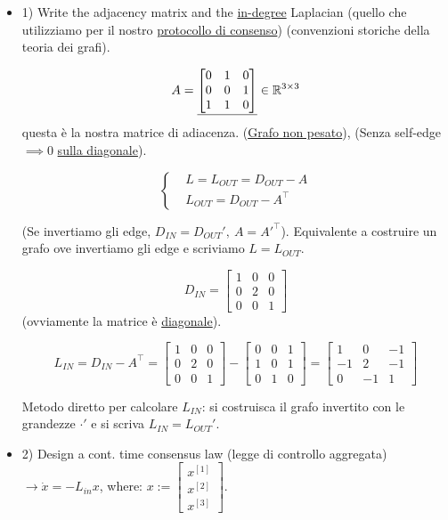 \begin{itemize}
\item{1)} Write the adjacency matrix and the \underline{in-degree} Laplacian (quello che utilizziamo per il nostro \underline{protocollo di consenso}) (convenzioni storiche della teoria dei grafi).

\[
	A = \underline{\begin{bmatrix}0&1&0\\0&0&1\\1&1&0\end{bmatrix}} \in\mathbb{R}^{3\times 3}
\]
questa è la nostra matrice di adiacenza. (\underline{Grafo non pesato}), (Senza self-edge $\implies 0$ \underline{sulla diagonale}).

\[
	\left\{
	\begin{aligned}
	&L = L_{OUT} = D_{OUT} - A\\
	&L_{OUT} = D_{OUT} - A^\top
	\end{aligned}
	\right.
\]

(Se invertiamo gli edge, $D_{IN} = D_{OUT}',\ A=A'^\top$). Equivalente a costruire un grafo ove invertiamo gli edge e scriviamo $L=L_{OUT}$.

\[
	D_{IN} = \begin{bmatrix}1&0&0\\0&2&0\\0&0&1\end{bmatrix}
\]
(ovviamente la matrice è \underline{diagonale}).

\[
	L_{IN} = D_{IN} - A^\top = \begin{bmatrix}1&0&0\\0&2&0\\0&0&1\end{bmatrix} - 
	\begin{bmatrix}0&0&1\\1&0&1\\0&1&0\end{bmatrix} = \begin{bmatrix}1&0&-1\\-1&2&-1\\0&-1&1\end{bmatrix}
\]

Metodo diretto per calcolare $L_{IN}$: si costruisca il grafo invertito con le grandezze $\mathord{\cdot}'$ e si scriva $L_{IN} = L_{OUT}'$.

\item{2)} Design a cont. time consensus law (legge di controllo aggregata) $\rightarrow \dot{x} = -L_{in}x$, where: $x := \begin{bmatrix}x^{[1]}\\x^{[2]}\\x^{[3]}\end{bmatrix}$.


\end{itemize}
